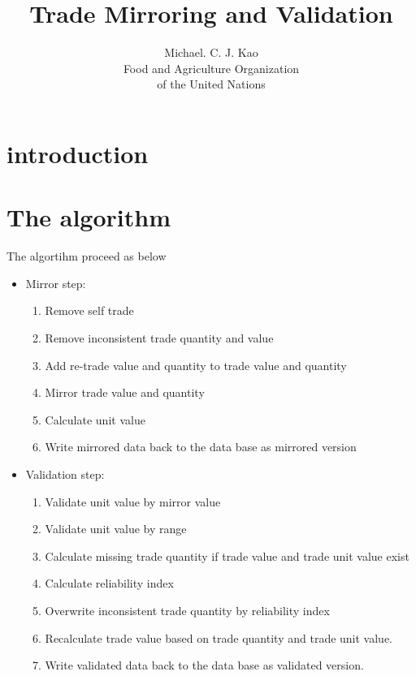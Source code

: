 \documentclass[nojss]{jss}
\title{\bf Trade Mirroring and Validation}
\author{Michael. C. J. Kao\\ Food and Agriculture Organization \\ of
  the United Nations}
\begin{document}
\section{introduction}

\section{The algorithm}


The algortihm proceed as below
\begin{itemize}
  \item Mirror step:
  \begin{enumerate}
    \item Remove self trade
    \item Remove inconsistent trade quantity and value
    \item Add re-trade value and quantity to trade value and quantity
    \item Mirror trade value and quantity
    \item Calculate unit value
    \item Write mirrored data back to the data base as mirrored version
  \end{enumerate}
  \item Validation step:
  \begin{enumerate}
    \item Validate unit value by mirror value
    \item Validate unit value by range
    \item Calculate missing trade quantity if trade value and trade unit value exist
    \item Calculate reliability index
    \item Overwrite inconsistent trade quantity by reliability index
    \item Recalculate trade value based on trade quantity and trade unit value.
    \item Write validated data back to the data base as validated version.    
  \end{enumerate}
\end{itemize}
  
\end{document}
